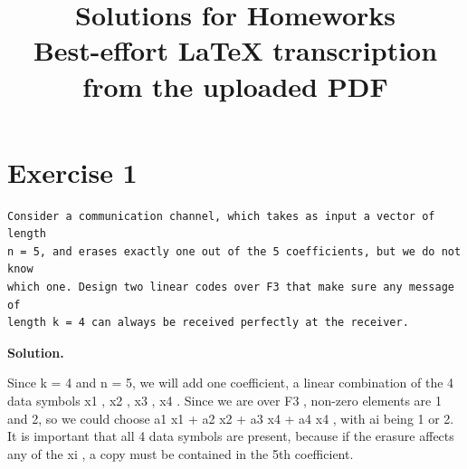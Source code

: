 \documentclass[11pt]{article}
\title{Solutions for Homeworks\\\large Best-effort LaTeX transcription from the uploaded PDF}
\author{}
\date{}
\begin{document}
\maketitle
\tableofcontents
\newpage
\section*{Exercise 1}
\begin{exercisebox}
\begin{Verbatim}[fontsize=\small]
Consider a communication channel, which takes as input a vector of length
n = 5, and erases exactly one out of the 5 coefficients, but we do not know
which one. Design two linear codes over F3 that make sure any message of
length k = 4 can always be received perfectly at the receiver.
\end{Verbatim}
\end{exercisebox}
\begin{solutionbox}
\textbf{Solution.}

Since k = 4 and n = 5, we will add one coefficient, a linear combination of the 4 data symbols x1 , x2 , x3 , x4 . Since we are over F3 , non-zero elements are 1 and 2, so we could choose a1 x1 + a2 x2 + a3 x4 + a4 x4 , with ai being 1 or 2. It is important that all 4 data symbols are present, because if the erasure affects any of the xi , a copy must be contained in the 5th coefficient.

\end{solutionbox}
\end{document}
